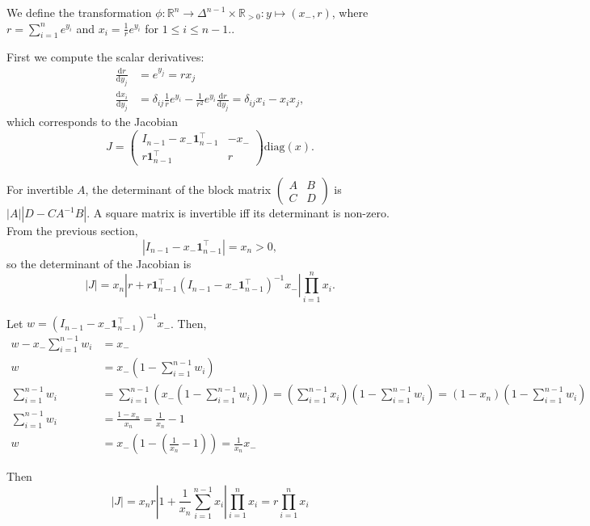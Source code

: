 \documentclass[11pt]{article}
\begin{document}
We define the transformation
$\phi: \mathbb{R}^n \to \Delta^{n-1} \times \mathbb{R}_{>0}: y \mapsto
(x_-, r)$, where $r = \sum_{i=1}^n e^{y_i}$ and
$x_i = \frac{1}{r} e^{y_i}$ for $1 \le i \le n-1$..

First we compute the scalar derivatives:
\[
\begin{aligned}
  \frac{\mathrm{d} r}{\mathrm{d} y_j}
  &= e^{y_j} = r x_j
  \\
  \frac{\mathrm{d} x_i}{\mathrm{d} y_j}
  &= \delta_{ij} \frac{1}{r} e^{y_i} - \frac{1}{r^2} e^{y_i} \frac{\mathrm{d} r}{\mathrm{d} y_j} = \delta_{ij} x_i - x_i x_j,
\end{aligned}
\]
which corresponds to the Jacobian
\[
  J = \begin{pmatrix}I_{n-1} - x_- \boldsymbol{1}_{n-1}^\top & -x_- \\
    r \boldsymbol{1}_{n-1}^\top & r \end{pmatrix} \mathrm{diag}(x).
\]

For invertible $A$, the determinant of the block matrix
$\begin{pmatrix}A & B \\ C & D\end{pmatrix}$ is $|A| |D-CA^{-1}B|$.  A
square matrix is invertible iff its determinant is non-zero.  From the
previous section,
\[
  |I_{n-1} - x_- \boldsymbol{1}_{n-1}^\top| = x_n > 0,
\]
so the determinant of the Jacobian is
\[
  |J| = x_n \left|r + r \boldsymbol{1}_{n-1}^\top (I_{n-1} - x_-
    \boldsymbol{1}_{n-1}^\top)^{-1} x_-\right|
  \prod_{i=1}^n x_i.
\]

Let $w = (I_{n-1} - x_- \boldsymbol{1}_{n-1}^\top)^{-1} x_-$. Then,
\[
\begin{aligned}
    w - x_- \sum_{i=1}^{n-1} w_i &= x_-\\
    w &= x_- \left(1 - \sum_{i=1}^{n-1} w_i\right)\\
    \sum_{i=1}^{n-1} w_i &= \sum_{i=1}^{n-1} \left( x_- (1 - \sum_{i=1}^{n-1} w_i) \right) = \left(\sum_{i=1}^{n-1} x_i \right) \left(1 - \sum_{i=1}^{n-1} w_i\right) = (1 - x_n)  \left(1 - \sum_{i=1}^{n-1} w_i\right)\\
    \sum_{i=1}^{n-1} w_i &= \frac{1 - x_n}{x_n} = \frac{1}{x_n} - 1\\
    w &= x_- \left(1 - \left(\frac{1}{x_n} - 1\right)\right) = \frac{1}{x_n} x_-
  \end{aligned}
\]

Then
\[
  |J| = x_n r \left|1 + \frac{1}{x_n}\sum_{i=1}^{n-1} x_i\right|
  \prod_{i=1}^n x_i = r \prod_{i=1}^n x_i
\]
\end{document}
